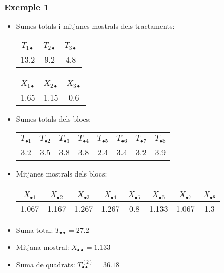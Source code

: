 \documentclass[12pt,t]{beamer}
\theoremstyle{plain}
\theoremstyle{definition}
\begin{document}
\begin{frame}
\frametitle{Exemple 1}
\begin{itemize}
\item Sumes totals i mitjanes mostrals dels tractaments:
\begin{center}
\begin{tabular}{c|c|c}
${T_{1\bullet}}$ & ${T_{2\bullet}}$ & ${T_{3\bullet}}$  \\
\hline
13.2  & 9.2  & 4.8
\end{tabular}
\qquad 
\begin{tabular}{c|c|c}
${\overline{X}_{1\bullet}}$ & ${\overline{X}_{2\bullet}}$ & ${\overline{X}_{3\bullet}}$  \\
\hline
1.65 & 1.15 & 0.6
\end{tabular}
\end{center}
\smallskip

\item Sumes totals dels blocs:
\begin{center}
\begin{tabular}{c|c|c|c|c|c|c|c}
${T_{\bullet1}}$ & ${T_{\bullet2}}$ & ${T_{\bullet3}}$ & ${T_{\bullet4}}$ & ${T_{\bullet5}}$ & ${T_{\bullet6}}$ & ${T_{\bullet7}}$ & ${T_{\bullet8}}$  \\
\hline
3.2 & 3.5 &  3.8 &  3.8 &  2.4 &  3.4 &  3.2 &  3.9
\end{tabular}
\end{center}
\smallskip


\item Mitjanes mostrals  dels blocs:
\vspace*{-2ex}

\begin{center}
\hspace*{-5ex}\begin{tabular}{c|c|c|c|c|c|c|c}
${\overline{X}_{\bullet1}}$ & ${\overline{X}_{\bullet2}}$ & ${\overline{X}_{\bullet3}}$ & ${\overline{X}_{\bullet4}}$ & ${\overline{X}_{\bullet5}}$ & ${\overline{X}_{\bullet6}}$ & ${\overline{X}_{\bullet7}}$ & ${\overline{X}_{\bullet8}}$  \\
\hline
1.067  &  1.167  &  1.267  &  1.267 & 0.8 & 1.133 & 1.067 & 1.3
\end{tabular}
\end{center}
\smallskip


\item Suma total: $T_{\bullet\bullet}=27.2$
\smallskip



\item Mitjana mostral: $\overline{X}_{\bullet\bullet}=1.133$
\smallskip



\item Suma de quadrats: $T^{(2)}_{\bullet\bullet}=36.18$

\end{itemize}
\end{frame}
\end{document}
